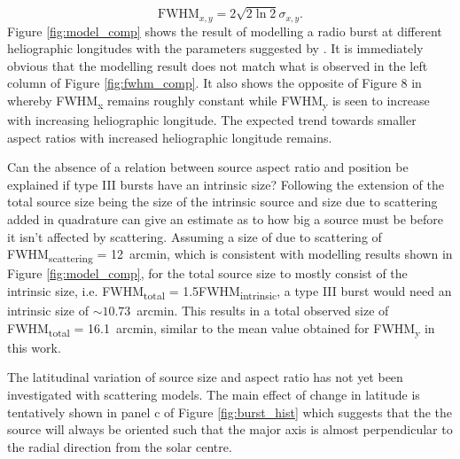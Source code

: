 \begin{equation}
\label{eq:FWHM}
\mbox{FWHM}_{x,y} = 2\sqrt{2\ln2}\sigma_{x,y}.
\end{equation}
Figure \ref{fig:model_comp} shows the result of modelling a radio burst at different heliographic longitudes with the parameters suggested by \cite{Zhang2021}. It is immediately obvious that the modelling result does not match what is observed in the left column of Figure \ref{fig:fwhm_comp}. It also shows the opposite of Figure 8 in \cite{Kontar2019} whereby FWHM\textsubscript{x} remains roughly constant while FWHM\textsubscript{y} is seen to increase with increasing heliographic longitude. The expected trend towards smaller aspect ratios with increased heliographic longitude remains.

Can the absence of a relation between source aspect ratio and position be explained if type III bursts have an intrinsic size? Following the extension of the total source size being the size of the intrinsic source and size due to scattering added in quadrature can give an estimate as to how big a source must be before it isn't affected by scattering. Assuming a size of due to scattering of FWHM\textsubscript{scattering} = 12~arcmin, which is consistent with modelling results shown in Figure \ref{fig:model_comp}, for the total source size to mostly consist of the intrinsic size, i.e. FWHM\textsubscript{total} = 1.5FWHM\textsubscript{intrinsic}, a type III burst would need an intrinsic size of $\sim 10.73$~arcmin. This results in a total observed size of FWHM\textsubscript{total} = 16.1~arcmin, similar to the mean value obtained for FWHM\textsubscript{y} in this work.

The latitudinal variation of source size and aspect ratio has not yet been investigated with scattering models. The main effect of change in latitude is tentatively shown in panel c of Figure \ref{fig:burst_hist} which suggests that the the source will always be oriented such that the major axis is almost perpendicular to the radial direction from the solar centre.



